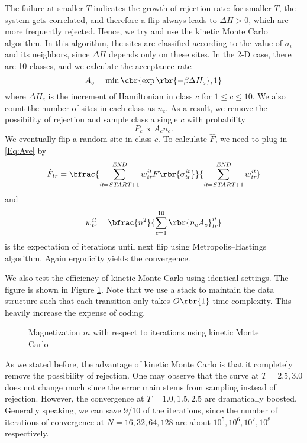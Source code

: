 \documentclass[english, nochinese]{pnote}
\begin{document}
The failure at smaller $T$ indicates the growth of rejection rate: for smaller $T$, the system gets correlated, and therefore a flip always leads to $ \Delta H > 0 $, which are more frequently rejected. Hence, we try and use the kinetic Monte Carlo algorithm. In this algorithm, the sites are classified according to the value of $\sigma_i$ and its neighbors, since $ \Delta H $ depends only on these sites. In the 2-D case, there are 10 classes, and we calculate the acceptance rate
\begin{equation}
A_c = \min \cbr{ \exp \rbr{ -\beta \Delta H_c }, 1 }
\end{equation}
where $ \Delta H_c $ is the increment of Hamiltonian in class $c$ for $ 1 \le c \le 10 $. We also count the number of sites in each class as $n_c$. As a result, we remove the possibility of rejection and sample class a single $c$ with probability
\begin{equation}
P_c \propto A_c n_c.
\end{equation}
We eventually flip a random site in class $c$. To calculate $\hat{F}$, we need to plug in \eqref{Eq:Ave} by
\begin{equation}
\hat{F}_{\mathit{tr}} = \bfrac{ \sum_{ \textit{it} = \textit{START} + 1 }^{\textit{END}} w_{\textit{tr}}^{\textit{it}} F \rbr{\sigma_{\mathit{tr}}^{\mathit{it}} } }{ \sum_{ \textit{it} = \textit{START} + 1 }^{\textit{END}} w_{\textit{tr}}^{\textit{it}} }
\end{equation}
and
\begin{equation}
w_{\textit{tr}}^{\textit{it}} = \bfrac{n^2}{ \sum_{ c = 1 }^{10} \rbr{ n_c A_c }_{\textit{tr}}^{\textit{it}} }
\end{equation}
is the expectation of iterations until next flip using Metropolis--Hastings algorithm. Again ergodicity yields the convergence.

We also test the efficiency of kinetic Monte Carlo using identical settings. The figure is shown in Figure \ref{Fig:KMC}. Note that we use a stack to maintain the data structure such that each transition only takes $ O \rbr{1} $ time complexity. This heavily increase the expense of coding.

\begin{figure}[htbp]
\centering
\scalebox{0.666}{}
\caption{Magnetization $m$ with respect to iterations using kinetic Monte Carlo}
\label{Fig:KMC}
\end{figure}

As we stated before, the advantage of kinetic Monte Carlo is that it completely remove the possibility of rejection. One may observe that the curve at $ T = 2.5, 3.0 $ does not change much since the error main stems from sampling instead of rejection. However, the convergence at $ T = 1.0, 1.5, 2.5 $ are dramatically boosted. Generally speaking, we can save $ 9 / 10 $ of the iterations, since the number of iterations of convergence at $ N = 16, 32, 64, 128 $ are about $ 10^5, 10^6, 10^7, 10^8 $ respectively.
\end{document}
